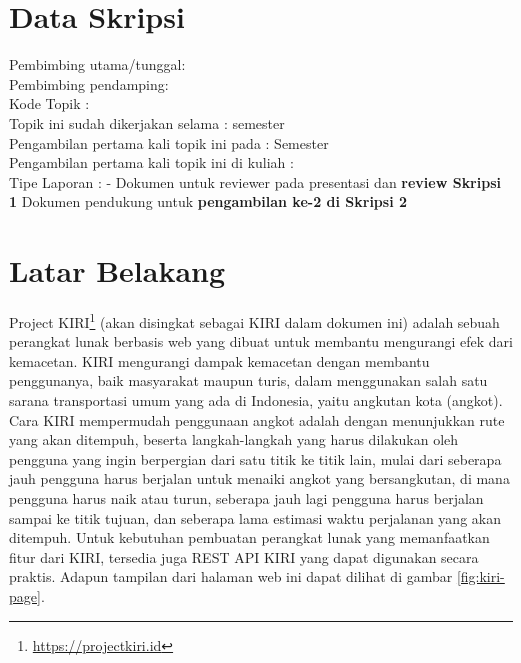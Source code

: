 \documentclass[a4paper,twoside]{article}
\begin{document}
\section{Data Skripsi} %
Pembimbing utama/tunggal: {\bf \pembA}\\
Pembimbing pendamping: {\bf \pembB}\\
Kode Topik : {\bf \kodetopik}\\
Topik ini sudah dikerjakan selama : {\bf \lamaSkripsi} semester\\
Pengambilan pertama kali topik ini pada : Semester {\bf \semesterPertama} \\
Pengambilan pertama kali topik ini di kuliah : {\bf \kulPertama} \\
Tipe Laporan : {\bf \tipePR} -
		{
		 {
				Dokumen untuk reviewer pada presentasi dan {\bf review Skripsi 1}}
			{	Dokumen pendukung untuk {\bf pengambilan ke-2 di Skripsi 2}}
		}
		
\section{Latar Belakang}
\label{sec:label}
Project KIRI\footnote{\href{https://projectkiri.id}{https://projectkiri.id}} (akan disingkat sebagai KIRI dalam dokumen ini) adalah sebuah perangkat lunak berbasis web yang dibuat untuk \mbox{membantu} mengurangi efek dari kemacetan. KIRI mengurangi dampak kemacetan dengan membantu penggunanya, baik \mbox{masyarakat} maupun turis, dalam menggunakan salah satu sarana transportasi umum yang ada di Indonesia, yaitu angkutan kota (angkot). Cara KIRI \mbox{mempermudah} penggunaan angkot adalah dengan menunjukkan rute yang akan ditempuh, beserta langkah-langkah yang harus dilakukan oleh pengguna yang ingin berpergian dari satu titik ke titik lain, mulai dari seberapa jauh pengguna harus berjalan untuk menaiki angkot yang bersangkutan, di mana pengguna harus naik atau turun, seberapa jauh lagi pengguna harus berjalan sampai ke titik tujuan, dan seberapa lama estimasi waktu perjalanan yang akan ditempuh. Untuk kebutuhan pembuatan perangkat lunak yang memanfaatkan fitur dari KIRI, tersedia juga REST API KIRI yang dapat digunakan secara praktis. Adapun tampilan dari halaman web ini dapat dilihat di gambar \ref{fig:kiri-page}. 
\end{document}
